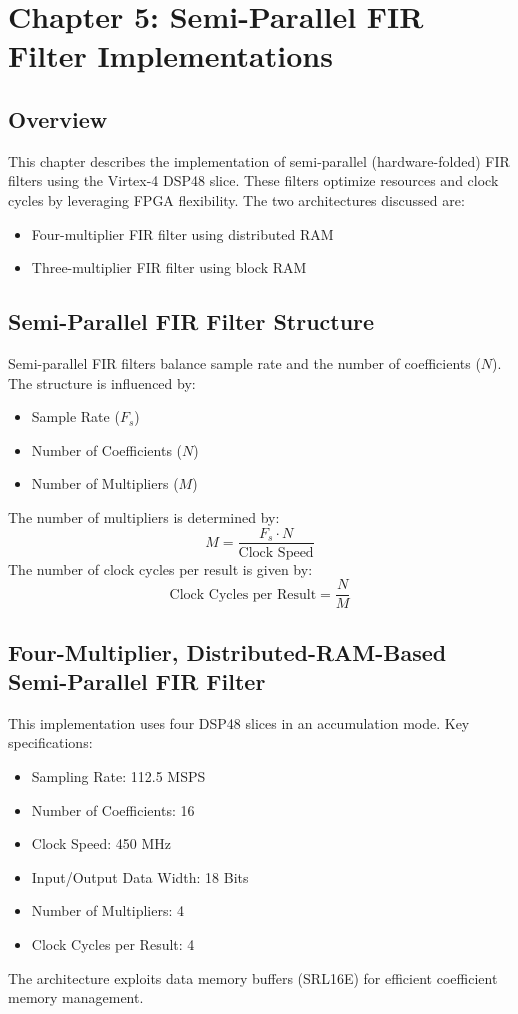\documentclass{article}
\begin{document}
	\section{Chapter 5: Semi-Parallel FIR Filter Implementations}
	\subsection{Overview}
	This chapter describes the implementation of semi-parallel (hardware-folded) FIR filters using the Virtex-4 DSP48 slice. These filters optimize resources and clock cycles by leveraging FPGA flexibility. The two architectures discussed are:
	\begin{itemize}
		\item Four-multiplier FIR filter using distributed RAM
		\item Three-multiplier FIR filter using block RAM
	\end{itemize}
	
	\subsection{Semi-Parallel FIR Filter Structure}
	Semi-parallel FIR filters balance sample rate and the number of coefficients ($N$). The structure is influenced by:
	\begin{itemize}
		\item Sample Rate ($F_s$)
		\item Number of Coefficients ($N$)
		\item Number of Multipliers ($M$)
	\end{itemize}
	The number of multipliers is determined by:
	\begin{equation}
		M = \frac{F_s \cdot N}{\text{Clock Speed}}
	\end{equation}
	The number of clock cycles per result is given by:
	\begin{equation}
		\text{Clock Cycles per Result} = \frac{N}{M}
	\end{equation}
	
	\subsection{Four-Multiplier, Distributed-RAM-Based Semi-Parallel FIR Filter}
	This implementation uses four DSP48 slices in an accumulation mode. Key specifications:
	\begin{itemize}
		\item Sampling Rate: 112.5 MSPS
		\item Number of Coefficients: 16
		\item Clock Speed: 450 MHz
		\item Input/Output Data Width: 18 Bits
		\item Number of Multipliers: 4
		\item Clock Cycles per Result: 4
	\end{itemize}
	The architecture exploits data memory buffers (SRL16E) for efficient coefficient memory management.
	
\end{document}
